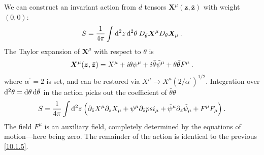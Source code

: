 We can construct an invariant action from $d$ tensors $\bm{X}^{\mu}(\bm{z},\bar{\bm{z}})$ with weight $(0,0)$:
\begin{equation}
	S= \frac{1}{4\pi} \int \mathrm{d}^{2}z\,\mathrm{d}^{2}\theta\: D_{\bar{\theta}}\bm{X}^{\mu}D_{\theta}\bm{X}_{\mu}\:.\label{12.3.18} 
\end{equation}
The Taylor expansion of $\bm{X}^{\mu}$ with respect to $\theta$ is
\begin{equation}
	\bm{X}^{\mu}(\bm{z},\bar{\bm{z}})=X^{\mu}+i\theta \psi^{\mu}+i\bar{\theta}\tilde{\psi}^{\mu}
	+\theta\bar{\theta}F^{\mu} \:. \label{12.3.19}
\end{equation}
where $\alpha^{\prime}=2$ is set, and can be restored via $X^{\mu}\to X^{\mu}(2/\alpha^{\prime})^{1/2}$. Integration over $\mathrm{d}^{2}\theta=\mathrm{d}\theta\,\mathrm{d}\bar{\theta}$ in the action picks out the coefficient of $\bar{\theta}\theta$
\begin{equation}
	S=\frac{1}{4\pi}\int\mathrm{d}^{2}z\:\Bigl(\partial_{\bar{z}}X^{\mu}\partial_{z}X_{\mu}+\psi^{\mu}\partial_{\bar{z}}psi_{\mu}+\tilde{\psi}^{\mu}\partial_{z}\tilde{\psi}_{\mu}+F^{\mu}F_{\mu}\Bigr) \:. \label{12.3.20}
\end{equation}
The field $F^{\mu}$ is an auxiliary field, completely determined by the equations of motion—here being zero. The remainder of the action is identical to the previous \eqref{10.1.5}.


